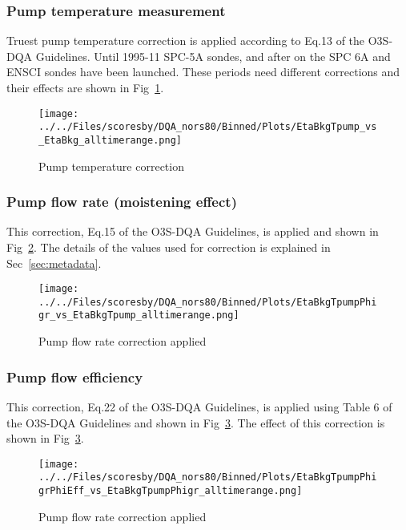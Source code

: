             \subsubsection{Pump temperature measurement}
 Truest pump temperature correction is applied according to Eq.13 of the O3S-DQA Guidelines. Until 1995-11 SPC-5A sondes,
 and after on the SPC 6A and ENSCI sondes have been launched. These periods need different corrections and
 their effects are shown in Fig~\ref{fig:tpump}.

%
                    \begin{figure}
        \centering
\texttt{[image: ../../Files/scoresby/DQA\_nors80/Binned/Plots/EtaBkgTpump\_vs\_EtaBkg\_alltimerange.png]}
    \caption{Pump temperature correction }
            \label{fig:tpump}
    \end{figure}
                \subsubsection{Pump flow rate (moistening effect)}
    This correction, Eq.15 of the O3S-DQA Guidelines, is applied and shown in Fig~\ref{fig:pf_ptu}. The details of the
values used for correction is explained in Sec~\ref{sec:metadata}.
%
                        \begin{figure}
        \centering
\texttt{[image: ../../Files/scoresby/DQA\_nors80/Binned/Plots/EtaBkgTpumpPhigr\_vs\_EtaBkgTpump\_alltimerange.png]}
    \caption{Pump flow rate correction applied}
            \label{fig:pf_ptu}
    \end{figure}
                   \subsubsection{Pump flow efficiency}
    This correction, Eq.22 of the O3S-DQA Guidelines, is applied using Table 6 of the O3S-DQA Guidelines and
    shown in Fig~\ref{fig:pf_eff}.
The effect of this correction is shown in Fig~\ref{fig:pf_eff}.
%
                        \begin{figure}
        \centering
\texttt{[image: ../../Files/scoresby/DQA\_nors80/Binned/Plots/EtaBkgTpumpPhigrPhiEff\_vs\_EtaBkgTpumpPhigr\_alltimerange.png]}
    \caption{Pump flow rate correction applied}
            \label{fig:pf_eff}
    \end{figure}


